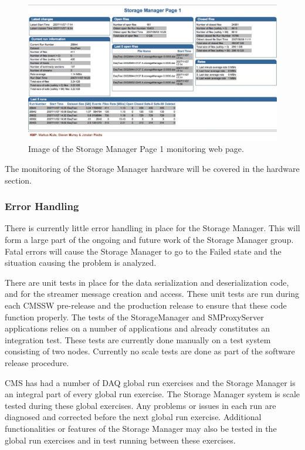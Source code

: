 \begin{figure}[hbtp]
  \begin{center}
    \includegraphics[width=5.5in]{Software/smpage1_example.eps}
    \caption{Image of the Storage Manager Page 1 monitoring web page.}
    \label{fig:sm_page1}
  \end{center}
\end{figure}

The monitoring of the Storage Manager hardware will be covered in the
hardware section.

\subsubsection{Error Handling}

There is currently little error handling in place for the Storage Manager. This
will form a large part of the ongoing and future work of the Storage Manager group.
Fatal errors will cause the Storage Manager to go to the Failed state and the
situation causing the problem is analyzed.

There are unit tests in place for the data serialization and deserialization code,
and for the streamer message creation and access. These unit tests are run during
each CMSSW pre-release and the production release to ensure that these code
function properly. The tests of the StorageManager and SMProxyServer applications
relies on a number of applications and already constitutes an integration test.
These tests are currently done manually on a test system consisting of two nodes.
Currently no scale tests are done as part of the software release procedure.

CMS has had a number of DAQ global run exercises and the Storage Manager is
an integral part of every global run exercise. The Storage Manager system is
scale tested during these global exercises. Any problems or issues in each run
are diagnosed and corrected before the next global run exercise. Additional
functionalities or features of the Storage Manager may also be tested in the
global run exercises and in test running between these exercises.

